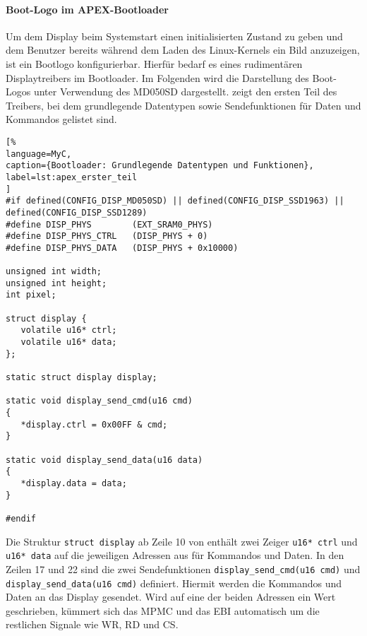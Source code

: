 \paragraph{Boot-Logo im APEX-Bootloader}
Um dem Display beim Systemstart einen initialisierten Zustand zu geben und dem Benutzer bereits während dem Laden des Linux-Kernels ein Bild anzuzeigen, ist ein Bootlogo konfigurierbar. Hierfür bedarf es eines rudimentären Displaytreibers im Bootloader. Im Folgenden wird die Darstellung des Boot-Logos unter Verwendung des MD050SD dargestellt.  zeigt den ersten Teil des Treibers, bei dem grundlegende Datentypen sowie Sendefunktionen für Daten und Kommandos gelistet sind. 

\begin{lstlisting}[%
language=MyC,
caption={Bootloader: Grundlegende Datentypen und Funktionen},
label=lst:apex_erster_teil
]
#if defined(CONFIG_DISP_MD050SD) || defined(CONFIG_DISP_SSD1963) || defined(CONFIG_DISP_SSD1289)
#define DISP_PHYS        (EXT_SRAM0_PHYS)
#define DISP_PHYS_CTRL   (DISP_PHYS + 0)
#define DISP_PHYS_DATA   (DISP_PHYS + 0x10000)

unsigned int width;
unsigned int height;
int pixel;

struct display {
   volatile u16* ctrl;
   volatile u16* data;
};

static struct display display;

static void display_send_cmd(u16 cmd)
{
   *display.ctrl = 0x00FF & cmd;
}

static void display_send_data(u16 data)
{
   *display.data = data;
}

#endif
\end{lstlisting}

Die Struktur \lstinline|struct display| ab Zeile 10 von  enthält zwei Zeiger \lstinline|u16* ctrl| und \lstinline|u16* data| auf die jeweiligen Adressen aus  für Kommandos und Daten. In den Zeilen 17 und 22 sind die zwei Sendefunktionen \lstinline|display_send_cmd(u16 cmd)| und 
\lstinline|display_send_data(u16 cmd)| definiert. Hiermit werden die Kommandos und Daten an das Display gesendet. Wird auf eine der beiden Adressen ein Wert geschrieben, kümmert sich das MPMC und das EBI automatisch um die restlichen Signale wie WR, RD und CS. 

